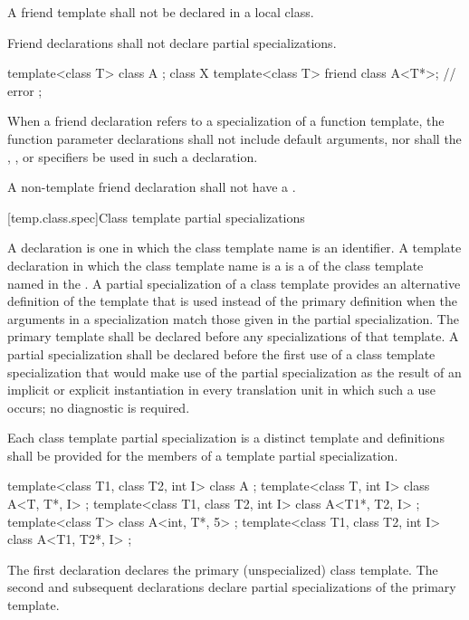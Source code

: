 \pnum
A friend template shall not be declared in a local class.

\pnum
Friend declarations shall not declare partial specializations.
\begin{example}

\begin{codeblock}
template<class T> class A { };
class X {
  template<class T> friend class A<T*>;         // error
};
\end{codeblock}
\end{example}

\pnum
When a friend declaration refers to a specialization of a function
template, the function parameter declarations shall not include
default arguments, nor shall
the , , or  specifiers
be used in such a declaration.

\pnum
A non-template friend declaration shall not have a .

[temp.class.spec]{Class template partial specializations}

\pnum
{}%
%
A
declaration is one in which the class template name is an
identifier.
A template declaration in which the class template name is a
is a
of the class template named in the
.
A partial specialization of a class template provides an alternative definition
of the template that is used instead of the primary definition when the
arguments in a specialization match those given in the partial
specialization.
The primary template shall be declared before any specializations of
that template.
A partial specialization shall be declared before the first use of a class template
specialization that would make use of the partial specialization as the result of
an implicit or explicit instantiation in every translation unit in which such a use
occurs; no diagnostic is required.

\pnum
Each class template partial specialization is a distinct template and
definitions shall be provided for the members of a template partial
specialization.

\pnum
\begin{example}
\begin{codeblock}
template<class T1, class T2, int I> class A             { };
template<class T, int I>            class A<T, T*, I>   { };
template<class T1, class T2, int I> class A<T1*, T2, I> { };
template<class T>                   class A<int, T*, 5> { };
template<class T1, class T2, int I> class A<T1, T2*, I> { };
\end{codeblock}

The first declaration declares the primary (unspecialized) class template.
The second and subsequent declarations declare partial specializations of
the primary template.
\end{example}

